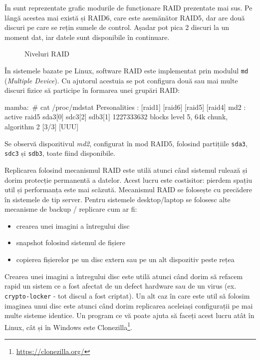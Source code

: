 În  sunt reprezentate grafic modurile de funcționare RAID prezentate mai sus.
Pe lângă acestea mai există și RAID6, care este asemănător RAID5, dar are două discuri pe care se rețin sumele de control.
Așadar pot pica 2 discuri la un moment dat, iar datele sunt disponibile în continuare.

\begin{figure}[htbp]
  \centering
  \def\svgwidth{\columnwidth}
  
  \caption{Niveluri RAID}
  \label{fig:storage:raid}
\end{figure}

În sistemele bazate pe Linux, software RAID este implementat prin modulul \texttt{md} (\textit{Multiple Device}).
Cu ajutorul acestuia se pot configura două sau mai multe discuri fizice să participe în formarea unei grupări RAID:

\begin{screen}
mamba:~# cat /proc/mdstat
Personalities : [raid1] [raid6] [raid5] [raid4]
md2 : active raid5 sda3[0] sdc3[2] sdb3[1]
      1227333632 blocks level 5, 64k chunk, algorithm 2 [3/3] [UUU]
\end{screen}

Se observă dispozitivul \textit{md2}, configurat în mod RAID5, folosind partițiile \texttt{sda3}, \texttt{sdc3} și \texttt{sdb3}, toate fiind disponibile.

Replicarea folosind mecanismul RAID este utilă atunci când sistemul rulează și dorim protecție permanentă a datelor.
Acest lucru este costisitor: pierdem spațiu util și performanța este mai scăzută.
Mecanismul RAID se folosește cu precădere în sistemele de tip server.
Pentru sistemele desktop/laptop se folosesc alte mecanisme de backup / replicare cum ar fi:

\begin{itemize}
  \item crearea unei imagini a întregului disc
  \item snapshot folosind sistemul de fișiere
  \item copierea fișierelor pe un disc extern sau pe un alt dispozitiv peste rețea
\end{itemize}

Crearea unei imagini a întregului disc este utilă atunci când dorim să refacem rapid un sistem ce a fost afectat de un defect hardware sau de un virus (ex. \texttt{crypto-locker} - tot discul a fost criptat).
Un alt caz în care este util să folosim imaginea unui disc este atunci când dorim replicarea aceleiași configurații pe mai multe sisteme identice.
Un program ce vă poate ajuta să faceți acest lucru atât în Linux, cât și în Windows este Clonezilla\footnote{\url{https://clonezilla.org/}}.

